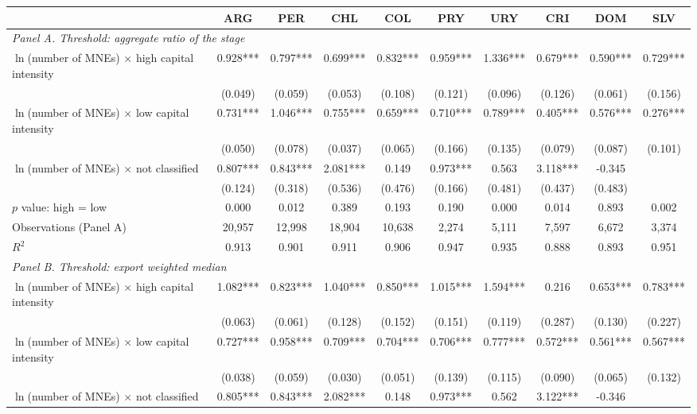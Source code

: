 \begin{tabular}{l*{9}{c}}
\toprule
 & ARG & PER & CHL & COL & PRY & URY & CRI & DOM & SLV \\
\midrule
\multicolumn{10}{l}{\textit{Panel A. Threshold: aggregate ratio of the stage}} \\
$\ln$(number of MNEs) $\times$ high capital intensity & 0.928*** & 0.797*** & 0.699*** & 0.832*** & 0.959*** & 1.336*** & 0.679*** & 0.590*** & 0.729*** \\
 & (0.049) & (0.059) & (0.053) & (0.108) & (0.121) & (0.096) & (0.126) & (0.061) & (0.156) \\
$\ln$(number of MNEs) $\times$ low capital intensity & 0.731*** & 1.046*** & 0.755*** & 0.659*** & 0.710*** & 0.789*** & 0.405*** & 0.576*** & 0.276*** \\
 & (0.050) & (0.078) & (0.037) & (0.065) & (0.166) & (0.135) & (0.079) & (0.087) & (0.101) \\
$\ln$(number of MNEs) $\times$ not classified & 0.807*** & 0.843*** & 2.081*** & 0.149 & 0.973*** & 0.563 & 3.118*** & -0.345 &  \\
 & (0.124) & (0.318) & (0.536) & (0.476) & (0.166) & (0.481) & (0.437) & (0.483) &  \\
$p$ value: high = low & 0.000 & 0.012 & 0.389 & 0.193 & 0.190 & 0.000 & 0.014 & 0.893 & 0.002 \\
Observations (Panel A) & 20,957 & 12,998 & 18,904 & 10,638 & 2,274 & 5,111 & 7,597 & 6,672 & 3,374 \\
$R^2$ & 0.913 & 0.901 & 0.911 & 0.906 & 0.947 & 0.935 & 0.888 & 0.893 & 0.951 \\
\midrule
\multicolumn{10}{l}{\textit{Panel B. Threshold: export weighted median}} \\
$\ln$(number of MNEs) $\times$ high capital intensity & 1.082*** & 0.823*** & 1.040*** & 0.850*** & 1.015*** & 1.594*** & 0.216 & 0.653*** & 0.783*** \\
 & (0.063) & (0.061) & (0.128) & (0.152) & (0.151) & (0.119) & (0.287) & (0.130) & (0.227) \\
$\ln$(number of MNEs) $\times$ low capital intensity & 0.727*** & 0.958*** & 0.709*** & 0.704*** & 0.706*** & 0.777*** & 0.572*** & 0.561*** & 0.567*** \\
 & (0.038) & (0.059) & (0.030) & (0.051) & (0.139) & (0.115) & (0.090) & (0.065) & (0.132) \\
$\ln$(number of MNEs) $\times$ not classified & 0.805*** & 0.843*** & 2.082*** & 0.148 & 0.973*** & 0.562 & 3.122*** & -0.346 &  \\

\end{tabular}
